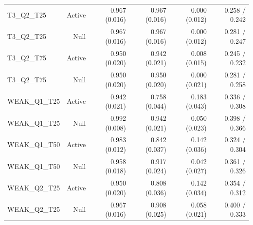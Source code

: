\begin{longtable}{lrrrrr}
T3\_Q2\_T25 & Active & 0.967 (0.016) & 0.967 (0.016) & 0.000 (0.012) & 0.258 / 0.242 \\
T3\_Q2\_T25 & Null & 0.967 (0.016) & 0.967 (0.016) & 0.000 (0.012) & 0.281 / 0.247 \\
T3\_Q2\_T75 & Active & 0.950 (0.020) & 0.942 (0.021) & 0.008 (0.015) & 0.245 / 0.232 \\
T3\_Q2\_T75 & Null & 0.950 (0.020) & 0.950 (0.020) & 0.000 (0.021) & 0.281 / 0.258 \\
WEAK\_Q1\_T25 & Active & 0.942 (0.021) & 0.758 (0.044) & 0.183 (0.043) & 0.336 / 0.308 \\
WEAK\_Q1\_T25 & Null & 0.992 (0.008) & 0.942 (0.021) & 0.050 (0.023) & 0.398 / 0.366 \\
WEAK\_Q1\_T50 & Active & 0.983 (0.012) & 0.842 (0.037) & 0.142 (0.036) & 0.324 / 0.304 \\
WEAK\_Q1\_T50 & Null & 0.958 (0.018) & 0.917 (0.024) & 0.042 (0.027) & 0.361 / 0.326 \\
WEAK\_Q2\_T25 & Active & 0.950 (0.020) & 0.808 (0.036) & 0.142 (0.034) & 0.354 / 0.312 \\
WEAK\_Q2\_T25 & Null & 0.967 (0.016) & 0.908 (0.025) & 0.058 (0.021) & 0.400 / 0.333 \\
\bottomrule
\end{longtable}
